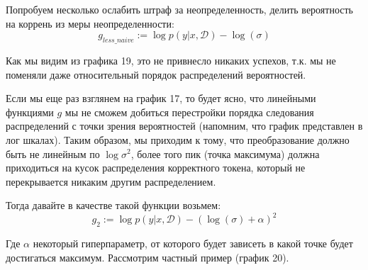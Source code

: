\documentclass[a4paper,14pt]{extarticle}
\begin{document}
	\begin{figure}[t]
	\end{figure}
	
	Попробуем несколько ослабить штраф за неопределенность, делить вероятность на коррень из меры неопределенности:
	\begin{equation}
		g_{less\_naive} := \log p(y | x, \mathcal{D}) - \log(\sigma)
	\end{equation}
	
	Как мы видим из графика 19, это не привнесло никаких успехов, т.к. мы не поменяли даже относительный порядок распределений вероятностей.
	
	Если мы еще раз взглянем на график 17, то будет ясно, что линейными функциями $g$ мы не сможем добиться перестройки порядка следования распределений с точки зрения вероятностей (напомним, что график представлен в лог шкалах). Таким образом, мы приходим к тому, что преобразование должно быть не линейным по $\log \sigma^2$, более того пик (точка максимума) должна приходиться на кусок распределения корректного токена, который не перекрывается никаким другим распределением.
	
	Тогда давайте в качестве такой функции возьмем:
	\begin{equation}
		g_{2} := \log p(y | x, \mathcal{D}) - (\log(\sigma) + \alpha)^2
	\end{equation}
	
	 Где $\alpha$ некоторый гиперпараметр, от которого будет зависеть в какой точке будет достигаться максимум. Рассмотрим частный пример (график 20).
	 
\end{document}
